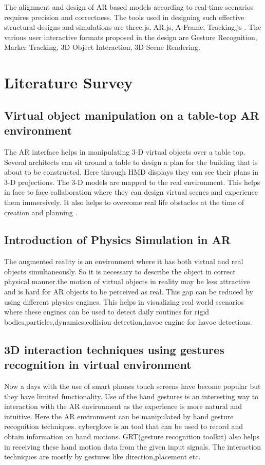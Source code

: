 \documentclass[conference]{IEEEtran}
\begin{document}
The alignment and design of AR based models according to real-time scenarios requires precision and correctness. The tools used in designing such effective structural designs and simulations are three.js, AR.js, A-Frame, Tracking.js . The various user interactive formats proposed in the design are Gesture Recognition, Marker Tracking, 3D Object Interaction, 3D Scene Rendering.
\section{Literature Survey}
\subsection{Virtual object manipulation on a table-top AR environment}
 The AR interface helps in manipulating 3-D virtual objects over a table top\cite{tabletop}. Several architects can sit around a table to design a plan for the building that is about to be constructed. Here through HMD displays they can see their plans in 3-D projections. The 3-D models are mapped to the real environment. This helps in face to face collaboration where they can design virtual scenes and experience them immersively. It also helps to overcome real life obstacles at the time of creation and planning . 

\subsection{Introduction of Physics Simulation in AR}
The augmented reality is an environment where it has both virtual and real objects simultaneously. So it is necessary to describe the object in correct physical manner.the motion of virtual objects in reality may be less attractive and is hard for AR objects to be perceived as real. This gap can be reduced by using different physics engines. This helps in visualizing real world scenarios where these engines can be used to detect daily routines for rigid bodies,particles,dynamics,collision detection,havoc engine for havoc detections\cite{introphysics}.

\subsection{3D interaction techniques using gestures recognition in virtual environment}
Now a days with the use of smart phones touch screens have become popular but they have limited functionality. Use of the hand gestures is an interesting way to interaction with the AR environment as the experience is more natural and intuitive. Here the AR environment can be manipulated by hand gesture recognition techniques\cite{gestureinteraction}. cyberglove is an tool that can be used to record and obtain information on hand motions. GRT(gesture recognition toolkit) also helps in receiving these hand motion data from the given input signals. The interaction techniques are mostly by gestures like direction,placement etc.
\end{document}
